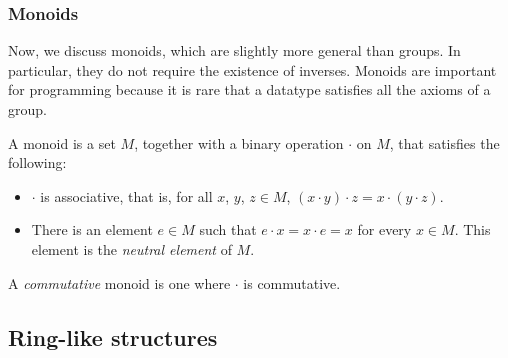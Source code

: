 \subsubsection{Monoids}
Now, we discuss monoids, which are slightly more general than groups. In particular, they do not require the existence of inverses. Monoids are important for programming because it is rare that a datatype satisfies all the axioms of a group.
\begin{Definition}
  A monoid is a set $M$, together with a binary operation $\cdot$ on $M$, that satisfies the following:
  \begin{itemize}
  \item $\cdot$ is associative, that is, for all $x$, $y$, $z \in M$, $(x \cdot y) \cdot z = x \cdot (y \cdot z)$. 
  \item There is an element $e \in M$ such that $e \cdot x = x \cdot e = x$ for every $x \in M$. This element is the \emph{neutral element} of $M$.
  \end{itemize}
\end{Definition}
A \emph{commutative} monoid is one where $\cdot$ is commutative.




\subsection{Ring-like structures}
